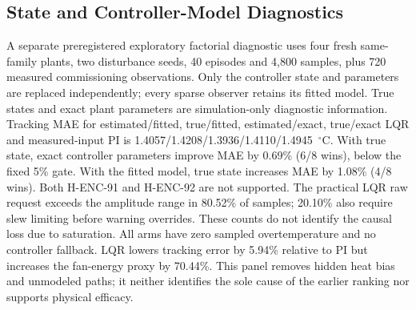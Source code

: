 \documentclass[conference,a4paper]{IEEEtran}
\begin{document}

\subsection{State and Controller-Model Diagnostics}
A separate preregistered exploratory factorial diagnostic uses four fresh same-family plants, two disturbance seeds, 40 episodes and 4,800 samples, plus 720 measured commissioning observations. Only the controller state and parameters are replaced independently; every sparse observer retains its fitted model. True states and exact plant parameters are simulation-only diagnostic information. Tracking MAE for estimated/fitted, true/fitted, estimated/exact, true/exact LQR and measured-input PI is 1.4057/\allowbreak{}1.4208/\allowbreak{}1.3936/\allowbreak{}1.4110/\allowbreak{}1.4945~$^\circ$C. With true state, exact controller parameters improve MAE by 0.69\% (6/8 wins), below the fixed 5\% gate. With the fitted model, true state increases MAE by 1.08\% (4/8 wins). Both H-ENC-91 and H-ENC-92 are not supported. The practical LQR raw request exceeds the amplitude range in 80.52\% of samples; 20.10\% also require slew limiting before warning overrides. These counts do not identify the causal loss due to saturation. All arms have zero sampled overtemperature and no controller fallback. LQR lowers tracking error by 5.94\% relative to PI but increases the fan-energy proxy by 70.44\%. This panel removes hidden heat bias and unmodeled paths; it neither identifies the sole cause of the earlier ranking nor supports physical efficacy.


\end{document}
